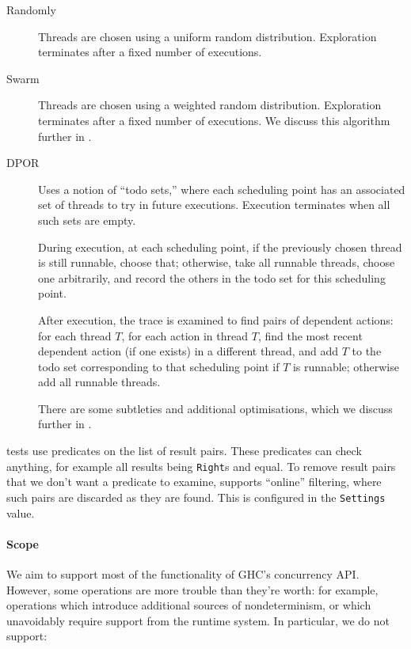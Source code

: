 \begin{description}
\item[Randomly] Threads are chosen using a uniform random
  distribution.  Exploration terminates after a fixed number of
  executions.

\item[Swarm] Threads are chosen using a weighted random distribution.
  Exploration terminates after a fixed number of executions.  We
  discuss this algorithm further in .

\item[DPOR] Uses a notion of ``todo sets,'' where each
  scheduling point has an associated set of threads to try in future
  executions.  Execution terminates when all such sets are empty.

  During execution, at each scheduling point, if the previously chosen
  thread is still runnable, choose that; otherwise, take all runnable
  threads, choose one arbitrarily, and record the others in the todo
  set for this scheduling point.

  After execution, the trace is examined to find pairs of dependent
  actions: for each thread $T$, for each action in thread $T$, find
  the most recent dependent action (if one exists) in a different
  thread, and add $T$ to the todo set corresponding to that scheduling
  point if $T$ is runnable; otherwise add all runnable threads.

  There are some subtleties and additional optimisations, which we
  discuss further in .
\end{description}

\dejafu{} tests use predicates on the list of result pairs.  These
predicates can check anything, for example all results being
\verb|Right|s and equal.  To remove result pairs that we don't want a
predicate to examine, \dejafu{} supports ``online'' filtering, where
such pairs are discarded as they are found.  This is configured in the
\verb|Settings| value.

\paragraph{Scope}
We aim to support most of the functionality of GHC’s concurrency API.
However, some operations are more trouble than they're worth: for
example, operations which introduce additional sources of
nondeterminism, or which unavoidably require support from the runtime
system.  In particular, we do not support:

